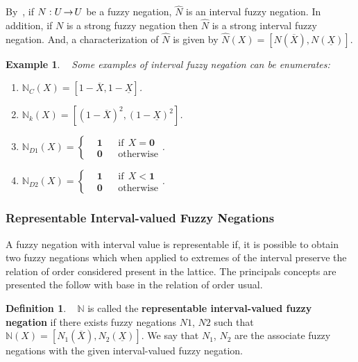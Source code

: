 \documentclass[conference]{IEEEtran}
\theoremstyle{plain}
\newtheorem{example}[theorem]{Example}
\theoremstyle{remark}
\theoremstyle{definition}
\newtheorem{definition}[theorem]{Definition}
\theoremstyle{proposition}
\newcommand{\lra}{\hspace{-0.05cm}\rightarrow\hspace{-0.05cm}}
\begin{document}
By~\cite[Theorem4.1.1]{BT06b}, if $N:U \lra U$  be a fuzzy negation, $\widehat{N}$  is an
interval fuzzy negation. In addition, if $N$ is a strong fuzzy
negation then $\widehat{N}$ is a strong interval fuzzy negation. And, a characterization of $\widehat{N}$ is given by $\widehat{N}(X)=[N(\overline{X}),N(\underline{X})]$.%

\begin{example}~\cite{baczynski2010ql} Some examples of interval fuzzy negation can be enumerates:
\begin{enumerate}
 \item $\mathbb{N}_C(X)=[1-\overline{X}, 1-\underline{X}]$.
 \item $\mathbb{N}_k(X)=[(1-\overline{X})^2, (1-\underline{X})^2]$.
 \item $\mathbb{N}_{D1}(X)=
 \left\{\begin{aligned}
 &\mathbf{1} &&\text{if} \ \   X=\mathbf{0}\\
 &\mathbf{0} &&\text{otherwise} 
\end{aligned}\right.$.
 \item $\mathbb{N}_{D2}(X)=
 \left\{\begin{aligned}
 &\mathbf{1} &&\text{if} \ \  X<\mathbf{1}\\
 &\mathbf{0} &&\text{otherwise}
\end{aligned}\right.$.
\end{enumerate}
\end{example}

\subsubsection{Representable Interval-valued Fuzzy Negations}

A fuzzy negation with interval value is representable if, it is possible to obtain two fuzzy negations which when applied to extremes of the interval preserve the relation of order considered present in the lattice. The  principals concepts are presented the follow with base in the relation of order usual.

\begin{definition}~\cite[Def. 4]{NEG1} $\mathbb{N}$ is called the \textbf{representable interval-valued fuzzy negation} if there exists fuzzy negations $N1$, $N2$ such that $\mathbb{N}(X) = [N_{1}(\overline{X}), N_{2}(\underline{X})]$. We say that $N_{1}$, $N_{2}$ are the associate fuzzy negations with the given interval-valued fuzzy negation.
\end{definition}
\end{document}
